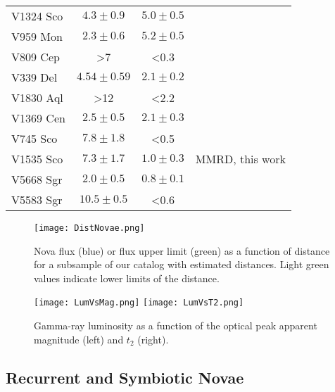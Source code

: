 \documentclass{aa} %
\begin{document}
\begin{table*}
\begin{tabular}{lccc}
V1324 Sco & $4.3\pm0.9$ & $5.0\pm0.5$ & \citet{Oezdoenmez}\\
V959 Mon & $2.3\pm0.6$ & $5.2\pm0.5$ & \citet{Linford}\\
V809 Cep & >7 & <0.3 & \citet{Munari2014}\\
V339 Del & $4.54\pm0.59$ & $2.1\pm0.2$ & \citet{2014Natur.515..234S}\\
V1830 Aql & >12 & <2.2 & \citet{Munari2014}\\
V1369 Cen & $2.5\pm0.5$ & $2.1\pm0.3$ & \citet{ATel6413}\\
V745 Sco & $7.8\pm1.8$ & <0.5 & \citet{Schaefer2010}\\
V1535 Sco & $7.3\pm1.7$ & $1.0\pm0.3$ & MMRD, this work\\
V5668 Sgr & $2.0\pm0.5$ & $0.8\pm0.1$ & \citet{Banerjee2015}\\
V5583 Sgr & $10.5\pm0.5$ & <0.6 & \citet{Schwarz2011}\\
\hline 
\end{tabular}
\end{table*}

\begin{figure}[htb!]
\begin{center}
\texttt{[image: DistNovae.png]}
\noindent
\caption{\small Nova flux (blue) or flux upper limit (green) as a function of distance for a subsample of our catalog with estimated distances. Light green values indicate lower limits of the distance.}
\label{fig:GammaOptCorr2}
\end{center}
\end{figure}

\begin{figure*}[htb!]
\begin{center}
\texttt{[image: LumVsMag.png]}
\texttt{[image: LumVsT2.png]}
\noindent
\caption{\small Gamma-ray luminosity as a function of the optical peak apparent magnitude (left) and $t_2$ (right).}
\label{fig:LgVsMag}
\end{center}
\end{figure*}

\subsection{Recurrent and Symbiotic Novae}
\label{subsec:recsymnovae}
\end{document}

